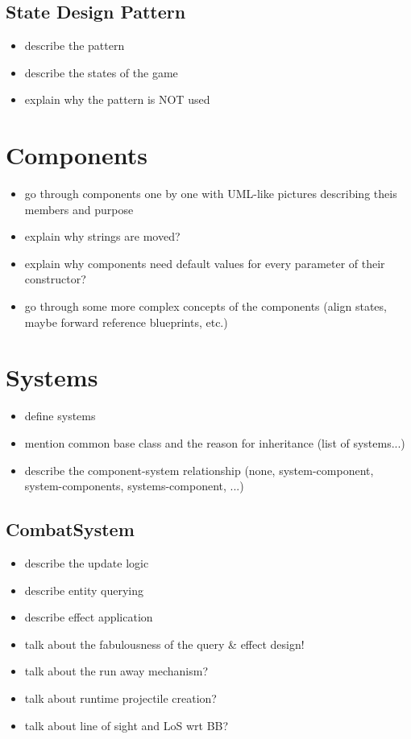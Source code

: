 \subsection{State Design Pattern}

\begin{itemize}
    \item describe the pattern
    \item describe the states of the game
    \item explain why the pattern is NOT used
\end{itemize}

\section{Components}

\begin{itemize}
    \item go through components one by one with UML-like pictures describing theis members and purpose
    \item explain why strings are moved?
    \item explain why components need default values for every parameter of their constructor?
    \item go through some more complex concepts of the components (align states, maybe forward reference blueprints, etc.)
\end{itemize}

\section{Systems}

\begin{itemize}
    \item define systems
    \item mention common base class and the reason for inheritance (list of systems...)
    \item describe the component-system relationship (none, system-component, system-components, systems-component, ...)
\end{itemize}

\subsection{CombatSystem}

\begin{itemize}
    \item describe the update logic
    \item describe entity querying
    \item describe effect application
    \item talk about the fabulousness of the query \& effect design!
    \item talk about the run away mechanism?
    \item talk about runtime projectile creation?
    \item talk about line of sight and LoS wrt BB?
\end{itemize}

